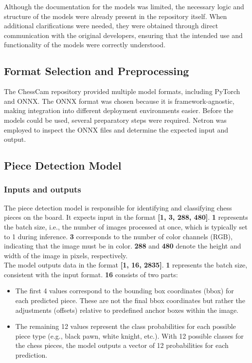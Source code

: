 Although the documentation for the models was limited, the necessary logic and structure of the models were already present in the repository itself. When additional clarifications were needed, they were obtained through direct communication with the original developers, ensuring that the intended use and functionality of the models were correctly understood. 

\subsection*{Format Selection and Preprocessing}
The ChessCam repository provided multiple model formats, including PyTorch and ONNX. The ONNX format was chosen because it is framework-agnostic, making integration into different deployment environments easier. Before the models could be used, several preparatory steps were required. Netron was employed to inspect the ONNX files and determine the expected input and output. \\

\newpage


\subsection{Piece Detection Model}
\subsubsection*{Inputs and outputs}
The piece detection model is responsible for identifying and classifying chess pieces on the board. It expects input in the format \textbf{[1, 3, 288, 480]}. \textbf{1} represents the batch size, i.e., the number of images processed at once, which is typically set to 1 during inference. \textbf{3} corresponds to the number of color channels (RGB), indicating that the image must be in color. \textbf{288} and \textbf{480} denote the height and width of the image in pixels, respectively. \\

The model outputs data in the format \textbf{[1, 16, 2835]}. \textbf{1} represents the batch size, consistent with the input format. \textbf{16} consists of two parts: \begin{itemize} \item The first 4 values correspond to the bounding box coordinates (bbox) for each predicted piece. These are not the final bbox coordinates but rather the adjustments (offsets) relative to predefined anchor boxes within the image. \item The remaining 12 values represent the class probabilities for each possible piece type (e.g., black pawn, white knight, etc.). With 12 possible classes for the chess pieces, the model outputs a vector of 12 probabilities for each prediction. \end{itemize} \\

